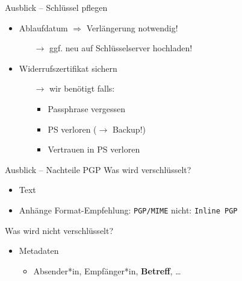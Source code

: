 \documentclass{beamer}
\begin{document}
\begin{frame}{Ausblick – Schlüssel pflegen}
  \begin{itemize}
  \item Ablaufdatum $\Rightarrow$ Verlängerung notwendig!
  \begin{itemize}
    \item[$\rightarrow$] ggf. neu auf Schlüsselserver hochladen!
  \end{itemize}

  \pause
  \vspace*{\baselineskip}

  \item Widerrufszertifikat sichern
  \begin{itemize}
    \item[$\rightarrow$] wir benötigt falls: 
    \begin{itemize}
      \item Passphrase vergessen
      \item PS verloren ($\rightarrow$ Backup!)
      \item Vertrauen in PS verloren
    \end{itemize}
  \end{itemize}
  \end{itemize}
\end{frame}


\begin{frame}{Ausblick – Nachteile PGP}
Was wird verschlüsselt?
\begin{itemize}
\item Text
\item Anhänge {\tiny Format-Empfehlung: \texttt{PGP/MIME} \quad nicht: \texttt{Inline PGP}}
\item[]
\end{itemize}
Was wird nicht verschlüsselt?
\begin{itemize}
 \item Metadaten
 \begin{itemize}
  \item Absender*in, Empfänger*in, \textbf{Betreff}, …
  \item[]
 \end{itemize}
\end{itemize}
\end{frame}

\end{document}
